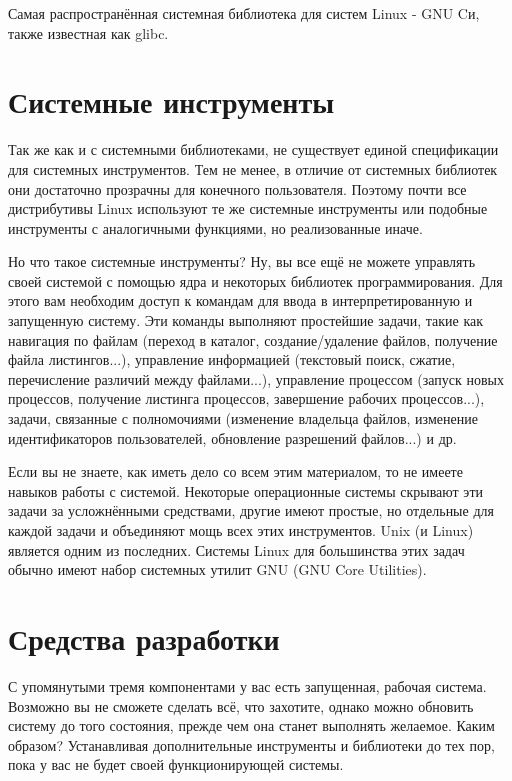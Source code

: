 \documentclass[10pt]{book}
\begin{document}
Самая распространённая системная библиотека для систем Linux - GNU Cи, также известная как glibc.

\section{Системные инструменты}

Так же как и с системными библиотеками, не существует единой спецификации для системных инструментов. Тем не менее, в отличие от системных библиотек они достаточно прозрачны для конечного пользователя. Поэтому почти все дистрибутивы Linux используют те же системные инструменты или подобные инструменты с  аналогичными функциями, но реализованные иначе.

Но что такое системные инструменты? Ну, вы все ещё не можете управлять своей системой с помощью ядра и некоторых библиотек программирования. Для этого вам необходим доступ к командам для ввода в интерпретированную и запущенную систему. Эти команды выполняют простейшие задачи, такие как навигация по файлам (переход в каталог, создание/удаление файлов, получение файла листингов...), управление информацией (текстовый поиск, сжатие, перечисление различий между файлами...), управление процессом (запуск  новых процессов, получение листинга процессов, завершение рабочих процессов...), задачи, связанные с полномочиями (изменение владельца файлов, изменение идентификаторов пользователей, обновление разрешений файлов...) и др.

Если вы не знаете, как иметь дело со всем этим материалом, то не имеете навыков работы с системой. Некоторые операционные системы скрывают эти задачи за усложнёнными средствами, другие имеют простые, но отдельные для каждой задачи и объединяют мощь всех этих инструментов. Unix (и Linux) является одним из последних. Системы Linux для большинства этих задач обычно имеют набор системных утилит GNU (GNU Core Utilities).

\section{Средства разработки}

С упомянутыми тремя компонентами у вас есть запущенная, рабочая  система. Возможно вы не сможете сделать всё, что захотите, однако можно обновить систему до того состояния, прежде чем она станет выполнять желаемое. Каким образом? Устанавливая дополнительные инструменты и библиотеки до тех пор, пока у вас не будет своей функционирующей системы.
\end{document}
